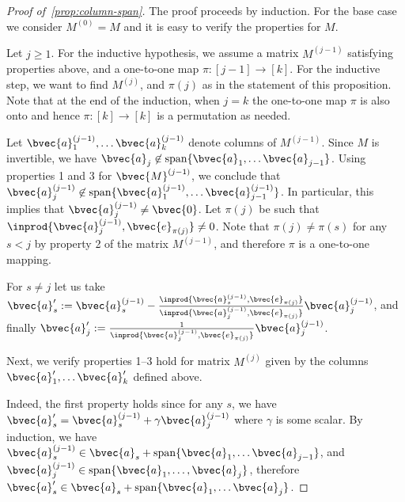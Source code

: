 \documentclass[11pt]{article}
\begin{document}
\begin{proof}[Proof of~\cref{prop:column-span}]
	The proof proceeds by induction. For the base case we consider $M^{(0)}=M$ and it is easy to verify the properties for $M$.
	
	Let $j\ge 1$. For the inductive hypothesis, we assume a matrix $M^{(j-1)}$ satisfying properties above, and a one-to-one map $\pi : [j-1] \to [k]$. For the inductive step, we want to find $M^{(j)}$, and $\pi(j)$ as in the statement of this proposition. Note that at the end of the induction, when $j=k$ the one-to-one map $\pi$ is also onto and hence $\pi:[k]\to [k]$ is a permutation as needed.
	
	Let $\bvec{a}^{(j-1)}_1, \ldots \bvec{a}^{(j-1)}_{k}$ denote columns of $M^{(j-1)}$. Since $M$ is invertible, we have $\bvec{a}_j \not \in \mathrm{span}\{\bvec{a}_1, \ldots \bvec{a}_{j-1}\}$. Using properties 1 and 3 for $\bvec{M}^{(j-1)}$, we conclude that $\bvec{a}_j^{(j-1)} \not\in \mathrm{span}\{\bvec{a}^{(j-1)}_1, \ldots \bvec{a}^{(j-1)}_{j-1}\}$. In particular, this implies that $\bvec{a}_j^{(j-1)} \not= \bvec{0}$. Let $\pi(j)$ be such that $\inprod{\bvec{a}^{(j-1)}_j, \bvec{e}_{\pi(j)}} \not= 0$. Note that $\pi(j) \not= \pi(s)$ for any $s < j$ by property 2 of the matrix $M^{(j-1)}$, and therefore $\pi$ is a one-to-one mapping.
	
	For $s \not= j$ let us take $\bvec{a}'_s := \bvec{a}^{(j-1)}_s - \frac{\inprod{\bvec{a}^{(j-1)}_{s}, \bvec{e}_{\pi(j)}}}{\inprod{\bvec{a}^{(j-1)}_{j}, \bvec{e}_{\pi(j)}}} \bvec{a}^{(j-1)}_j$, and finally $\bvec{a}'_j := \frac{1}{\inprod{\bvec{a}^{(j-1)}_{j}, \bvec{e}_{\pi(j)}}} \bvec{a}^{(j-1)}_j$.
	
	Next, we verify properties 1--3 hold for matrix $M^{(j)}$ given by the columns $\bvec{a}'_1, \ldots \bvec{a}'_k$ defined above.
	
	Indeed, the first property holds since for any $s$, we have $\bvec{a}'_s = \bvec{a}^{(j-1)}_s + \gamma \bvec{a}^{(j-1)}_j$ where $\gamma$ is some scalar. By induction, we have $\bvec{a}^{(j-1)}_s \in \bvec{a}_s + \mathrm{span}\{\bvec{a}_1, \ldots \bvec{a}_{j-1}\}$, and $\bvec{a}^{(j-1)}_j \in \mathrm{span}\{\bvec{a}_1, \ldots, \bvec{a}_j\}$, therefore  $\bvec{a}'_s \in \bvec{a}_s + \mathrm{span}\{\bvec{a}_1, \ldots \bvec{a}_j\}$.
	

\end{proof}
\end{document}
